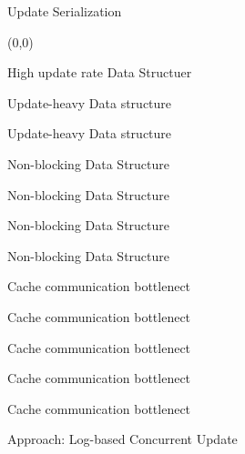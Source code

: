 \documentclass[english]{beamer} %
\begin{document}
\begin{frame}{Update Serialization}
\begin{textblock}{1}(0,0)
\end{textblock}
\end{frame}

\begin{frame}{High update rate Data Structuer}
\end{frame}

\begin{frame}{Update-heavy Data structure}
\end{frame}


\begin{frame}{Update-heavy Data structure}
\end{frame}

\begin{frame}{Non-blocking Data Structure}
\end{frame}


\begin{frame}{Non-blocking Data Structure}
\end{frame}


\begin{frame}{Non-blocking Data Structure}
\end{frame}


\begin{frame}{Non-blocking Data Structure}
\end{frame}


\begin{frame}{Cache communication bottlenect}
\end{frame}


\begin{frame}{Cache communication bottlenect}
\end{frame}


\begin{frame}{Cache communication bottlenect}
\end{frame}


\begin{frame}{Cache communication bottlenect}
\end{frame}

\begin{frame}{Cache communication bottlenect}
\end{frame}



\begin{frame}{Approach: Log-based Concurrent Update}
\end{frame}
\end{document}
